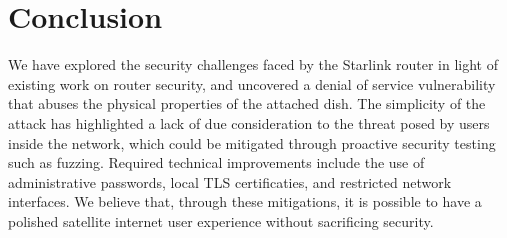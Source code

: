 \section{Conclusion}\label{sec:conclusion}

We have explored the security challenges faced by the Starlink router in light of existing work on router security, and uncovered a denial of service vulnerability that abuses the physical properties of the attached dish.
The simplicity of the attack has highlighted a lack of due consideration to the threat posed by users inside the network, which could be mitigated through proactive security testing such as fuzzing.
Required technical improvements include the use of administrative passwords, local TLS certificaties, and restricted network interfaces.
We believe that, through these mitigations, it is possible to have a polished satellite internet user experience without sacrificing security.
